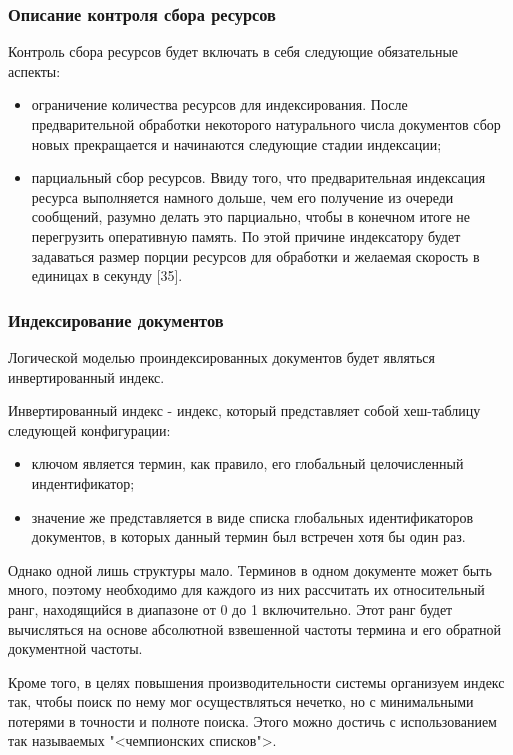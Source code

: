 \subsubsection{Описание контроля сбора ресурсов}
Контроль сбора ресурсов будет включать в себя следующие обязательные аспекты:
\begin{itemize}
\item ограничение количества ресурсов для индексирования. После предварительной обработки некоторого натурального числа документов сбор новых прекращается и начинаются следующие стадии индексации;
\item парциальный сбор ресурсов. Ввиду того, что предварительная индексация ресурса выполняется намного дольше, чем его получение из очереди сообщений, разумно делать это парциально, чтобы в конечном итоге не перегрузить оперативную память. По этой причине индексатору будет задаваться размер порции ресурсов для обработки и желаемая скорость в единицах в секунду [35].
\end{itemize}

\subsubsection{Индексирование документов}

Логической моделью проиндексированных документов будет являться инвертированный индекс. 

Инвертированный индекс - индекс, который представляет собой хеш-таблицу следующей конфигурации: 
\begin{itemize}
\item ключом является термин, как правило, его глобальный целочисленный индентификатор;
\item значение же представляется в виде списка глобальных идентификаторов документов, в которых данный термин был встречен хотя бы один раз.
\end{itemize}

Однако одной лишь структуры мало. Терминов в одном документе может быть много, поэтому необходимо для каждого из них рассчитать их относительный ранг, находящийся в диапазоне от 0 до 1 включительно. Этот ранг будет вычисляться на основе абсолютной взвешенной частоты термина и его обратной документной частоты.

Кроме того, в целях повышения производительности системы организуем индекс так, чтобы поиск по нему мог осуществляться нечетко, но с минимальными потерями в точности и полноте поиска. Этого можно достичь с использованием так называемых "<чемпионских списков">.

